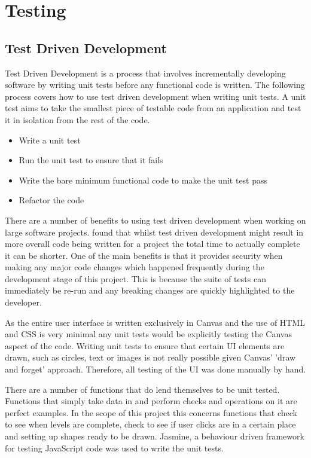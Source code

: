 \documentclass[12pt,a4paper]{report}
\begin{document}
\chapter{Testing}

\section{Test Driven Development}
Test Driven Development is a process that involves incrementally developing software by writing unit tests before any functional code is written. The following process covers how to use test driven development when writing unit tests. A unit test aims to take the smallest piece of testable code from an application and test it in isolation from the rest of the code. 

\begin{itemize}
   \item Write a unit test
   \item Run the unit test to ensure that it fails
   \item Write the bare minimum functional code to make the unit test pass
   \item Refactor the code
\end{itemize}

   There are a number of benefits to using test driven development when working on large software projects. \cite{muller2003return} found that whilst test driven development might result in more overall code being written for a project the total time to actually complete it can be shorter. One of the main benefits is that it provides security when making any major code changes which happened frequently during the development stage of this project. This is because the suite of tests can immediately be re-run and any breaking changes are quickly highlighted to the developer.

As the entire user interface is written exclusively in Canvas and the use of HTML and CSS is very minimal any unit tests would be explicitly testing the Canvas aspect of the code. Writing unit tests to ensure that certain UI elements are drawn, such as circles, text or images is not really possible given Canvas' 'draw and forget' approach. Therefore, all testing of the UI was done manually by hand.

There are a number of functions that do lend themselves to be unit tested. Functions that simply take data in and perform checks and operations on it are perfect examples. In the scope of this project this concerns functions that check to see when levels are complete, check to see if user clicks are in a certain place and setting up shapes ready to be drawn. Jasmine, a behaviour driven framework for testing JavaScript code was used to write the unit tests.
\end{document}
